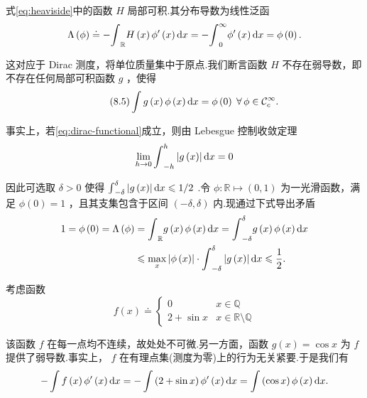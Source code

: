 \begin{instance}\label{ins:heaviside-dirac}
式\eqref{eq:heaviside}中的函数 $H$ 局部可积.其分布导数为线性泛函
\[
\Lambda \left( \phi \right)  \doteq   - {\int }_{\mathbb{R}}H\left( x\right) {\phi }^{\prime }\left( x\right) {\mathop{}\!\mathrm{d} x} =  - {\int }_{0}^{\infty }{\phi }^{\prime }\left( x\right) {\mathop{}\!\mathrm{d} x} = \phi \left( 0\right) .
\]

这对应于 Dirac 测度，将单位质量集中于原点.我们断言函数 $H$ 不存在弱导数，即不存在任何局部可积函数 $g$ ，使得
\begin{equation}\tag{8.5}\label{eq:dirac-functional}
\int g\left( x\right) \phi \left( x\right) {\mathop{}\!\mathrm{d} x} = \phi \left( 0\right) \;\forall\,\phi  \in  {\mathcal{C}}_{c}^{\infty }.
\end{equation}

事实上，若\eqref{eq:dirac-functional}成立，则由 Lebesgue 控制收敛定理
\[
\mathop{\lim }\limits_{{h \rightarrow  0}}{\int }_{-h}^{h}\left| {g\left( x\right) }\right| {\mathop{}\!\mathrm{d} x} = 0
\]

因此可选取 $\delta  > 0$ 使得 ${\int }_{-\delta }^{\delta }\left| {g\left( x\right) }\right| {\mathop{}\!\mathrm{d} x} \leqslant  1/2$ .令 $\phi  : \mathbb{R} \mapsto  \left(  {0,1}\right)$ 为一光滑函数，满足 $\phi \left( 0\right)  = 1$ ，且其支集包含于区间 $\left(  {-\delta ,\delta }\right)$ 内.现通过下式导出矛盾
{\begin{align*}
1 = \phi \left( 0\right)  = \Lambda \left( \phi \right)  &= {\int }_{\mathbb{R}}g\left( x\right) \phi \left( x\right) {\mathop{}\!\mathrm{d} x} = {\int }_{-\delta }^{\delta }g\left( x\right) \phi \left( x\right) {\mathop{}\!\mathrm{d} x}\\
&\leqslant  \mathop{\max }\limits_{x}\left| {\phi \left( x\right) }\right|  \cdot  {\int }_{-\delta }^{\delta }\left| {g\left( x\right) }\right| {\mathop{}\!\mathrm{d} x} \leqslant  \frac{1}{2}.
\end{align*}}
\end{instance}

\begin{instance}\label{ins:rational-irrational-weak-derivative}
考虑函数
\[
f\left( x\right)  \doteq  \begin{cases} 0 & x\in \mathbb{Q} \\  2 + \sin x & x\in\mathbb{R}\setminus\mathbb{Q}\end{cases}
\]

该函数 $f$ 在每一点均不连续，故处处不可微.另一方面，函数 $g\left( x\right)  = \cos x$ 为 $f$ 提供了弱导数.事实上， $f$ 在有理点集(测度为零)上的行为无关紧要.于是我们有
\[
- \int f\left( x\right) {\phi }^{\prime }\left( x\right) {\mathop{}\!\mathrm{d} x} =  - \int \left( {2 + \sin x}\right) {\phi }^{\prime }\left( x\right) {\mathop{}\!\mathrm{d} x} = \int \left( {\cos x}\right) \phi \left( x\right) {\mathop{}\!\mathrm{d} x}.
\]
\end{instance}

